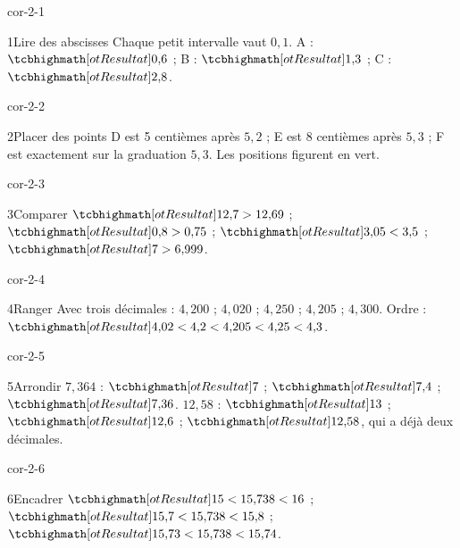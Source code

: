 \clearpage\pagestyle{otMain}\setlength{\otBlocEspacement}{2.5mm}\fontsize{11}{15}\selectfont{}
\begin{blocLivre}{cor-2-1}\begin{corrige}{1}{Lire des abscisses}
Chaque petit intervalle vaut $0{,}1$. A : $\res{0{,}6}$ ; B : $\res{1{,}3}$ ; C : $\res{2{,}8}$.
\label{fig-cor-2-1}
\end{corrige}\end{blocLivre}
\begin{blocLivre}{cor-2-2}\begin{corrige}{2}{Placer des points}
D est 5 centièmes après $5{,}2$ ; E est 8 centièmes après $5{,}3$ ; F est exactement sur la graduation $5{,}3$. Les positions figurent en vert.
\label{fig-cor-2-2}
\end{corrige}\end{blocLivre}
\begin{blocLivre}{cor-2-3}\begin{corrige}{3}{Comparer}
$\res{12{,}7>12{,}69}$ ; $\res{0{,}8>0{,}75}$ ; $\res{3{,}05<3{,}5}$ ; $\res{7>6{,}999}$.
\end{corrige}\end{blocLivre}
\begin{blocLivre}{cor-2-4}\begin{corrige}{4}{Ranger}
Avec trois décimales : $4{,}200$ ; $4{,}020$ ; $4{,}250$ ; $4{,}205$ ; $4{,}300$. Ordre : $\res{4{,}02<4{,}2<4{,}205<4{,}25<4{,}3}$.
\end{corrige}\end{blocLivre}
\begin{blocLivre}{cor-2-5}\begin{corrige}{5}{Arrondir}
$7{,}364$ : $\res7$ ; $\res{7{,}4}$ ; $\res{7{,}36}$. $12{,}58$ : $\res{13}$ ; $\res{12{,}6}$ ; $\res{12{,}58}$, qui a déjà deux décimales.
\end{corrige}\end{blocLivre}
\begin{blocLivre}{cor-2-6}\begin{corrige}{6}{Encadrer}
$\res{15<15{,}738<16}$ ; $\res{15{,}7<15{,}738<15{,}8}$ ; $\res{15{,}73<15{,}738<15{,}74}$.
\end{corrige}\end{blocLivre}
